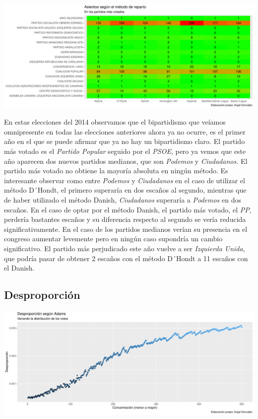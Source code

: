 \documentclass[12pt,a4paper,]{book}
\numberwithin{dummy}{section}
\theoremstyle{ocrenumbox}
\theoremstyle{blacknumex}
\theoremstyle{blacknumbox}
\theoremstyle{ocrenum}
\theoremstyle{ocrenum}
\begin{document}
\begin{center}\includegraphics[width=1\linewidth]{figurasR/unnamed-chunk-38-2} \end{center}

En estas elecciones del 2014 observamos que el bipartidismo que veíamos
omnipresente en todas las elecciones anteriores ahora ya no ocurre, es
el primer año en el que se puede afirmar que ya no hay un bipartidismo
claro. El partido más votado es el \emph{Partido Popular} seguido por el
\emph{PSOE}, pero ya vemos que este año aparecen dos nuevos partidos
medianos, que son \emph{Podemos} y \emph{Ciudadanos.} El partido más
votado no obtiene la mayoría absoluta en ningún método. Es interesante
observar como entre \emph{Podemos} y \emph{Ciudadanos} en el caso de
utilizar el método D´Hondt, el primero superaría en dos escaños al
segundo, mientras que de haber utilizado el método Danish,
\emph{Ciudadanos} superaría a \emph{Podemos} en dos escaños. En el caso
de optar por el método Danish, el partido más votado, el \emph{PP},
perdería bastantes escaños y su diferencia respecto al segundo se vería
reducida significativamente. En el caso de los partidos medianos verían
su presencia en el congreso aumentar levemente pero en ningún caso
supondría un cambio significativo. El partido más perjudicado este año
vuelve a ser \emph{Izquierda Unida}, que podría pasar de obtener 2
escaños con el método D´Hondt a 11 escaños con el Danish.

\hypertarget{desproporciuxf3n-11}{%
\subsection{Desproporción}\label{desproporciuxf3n-11}}

\begin{center}\includegraphics[width=1\linewidth]{figurasR/unnamed-chunk-39-1} \end{center}
\end{document}
